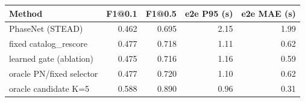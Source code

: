 \begin{tabular}{lrrrr}
\toprule
Method & F1@0.1 & F1@0.5 & e2e P95 (s) & e2e MAE (s) \\
\midrule
PhaseNet (STEAD) & 0.462 & 0.695 & 2.15 & 1.99 \\
fixed catalog\_rescore & 0.477 & 0.718 & 1.11 & 0.62 \\
learned gate (ablation) & 0.475 & 0.716 & 1.16 & 0.59 \\
oracle PN/fixed selector & 0.477 & 0.720 & 1.10 & 0.62 \\
oracle candidate K=5 & 0.588 & 0.890 & 0.96 & 0.31 \\
\bottomrule
\end{tabular}
